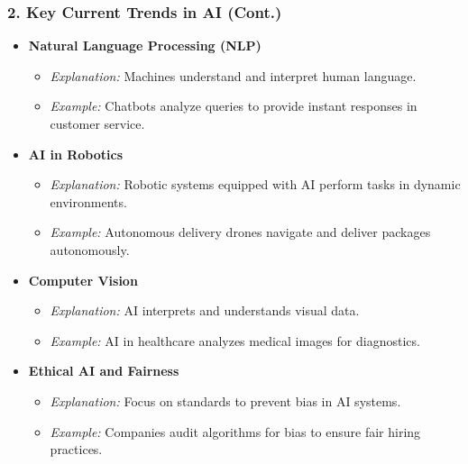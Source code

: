 \documentclass[aspectratio=169]{beamer}
\begin{document}
\begin{frame}[fragile]
    \frametitle{2. Key Current Trends in AI (Cont.)}
    \begin{itemize}
        \item \textbf{Natural Language Processing (NLP)}
            \begin{itemize}
                \item \textit{Explanation:} Machines understand and interpret human language.
                \item \textit{Example:} Chatbots analyze queries to provide instant responses in customer service.
            \end{itemize}
        
        \item \textbf{AI in Robotics}
            \begin{itemize}
                \item \textit{Explanation:} Robotic systems equipped with AI perform tasks in dynamic environments.
                \item \textit{Example:} Autonomous delivery drones navigate and deliver packages autonomously.
            \end{itemize}
        
        \item \textbf{Computer Vision}
            \begin{itemize}
                \item \textit{Explanation:} AI interprets and understands visual data.
                \item \textit{Example:} AI in healthcare analyzes medical images for diagnostics.
            \end{itemize}
        
        \item \textbf{Ethical AI and Fairness}
            \begin{itemize}
                \item \textit{Explanation:} Focus on standards to prevent bias in AI systems.
                \item \textit{Example:} Companies audit algorithms for bias to ensure fair hiring practices.
            \end{itemize}
    \end{itemize}
\end{frame}
\end{document}
